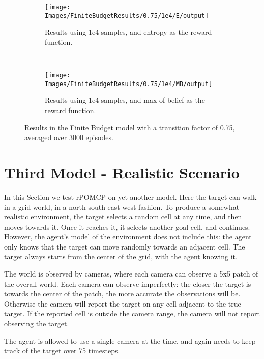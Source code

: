\begin{figure}[ht]
        \centering
        \begin{subfigure}[t]{0.45\textwidth}
                \texttt{[image: Images/FiniteBudgetResults/0.75/1e4/E/output]}
                \caption{Results using 1e4 samples, and entropy as the reward function.}
                \label{fig:fb4e75}
        \end{subfigure}%
        ~ %
        \begin{subfigure}[t]{0.45\textwidth}
                \texttt{[image: Images/FiniteBudgetResults/0.75/1e4/MB/output]}
                \caption{Results using 1e4 samples, and max-of-belief as the reward function.}
                \label{fig:fb5e75}
        \end{subfigure}
        \caption{Results in the Finite Budget model with a transition factor of 0.75, averaged over 3000 episodes.}
        \label{ref:fbentropyfig75}
\end{figure}

\section{Third Model - Realistic Scenario}

In this Section we test rPOMCP on yet another model. Here the target can walk in a grid world, in a
north-south-east-west fashion. To produce a somewhat realistic environment, the target selects a
random cell at any time, and then moves towards it. Once it reaches it, it selects another goal
cell, and continues. However, the agent's model of the environment does not include this: the agent
only knows that the target can move randomly towards an adjacent cell. The target always starts from
the center of the grid, with the agent knowing it.

The world is observed by cameras, where each camera can observe a 5x5 patch of the overall world.
Each camera can observe imperfectly: the closer the target is towards the center of the patch, the
more accurate the observations will be. Otherwise the camera will report the target on any cell
adjacent to the true target. If the reported cell is outside the camera range, the camera will not
report observing the target.

The agent is allowed to use a single camera at the time, and again needs to keep track of the target
over 75 timesteps.

